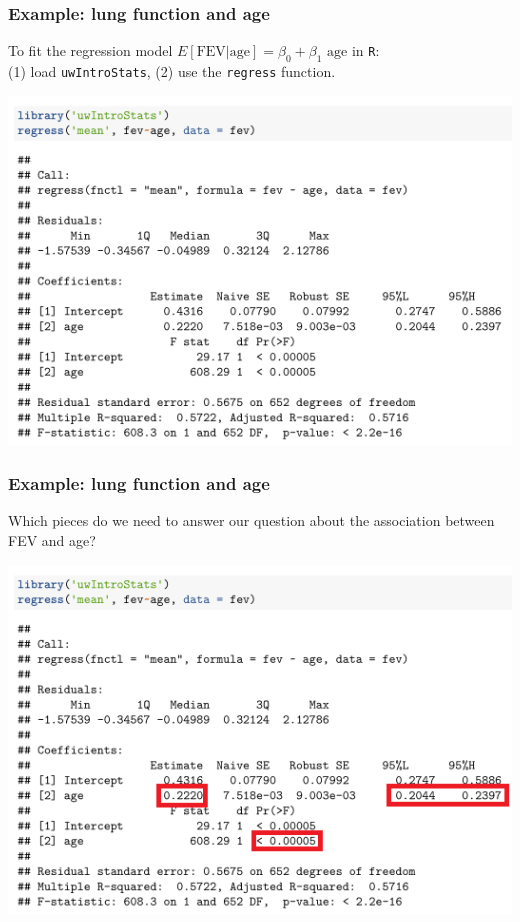 \documentclass[12pt, 
hyperref={colorlinks=true, linkcolor=blue, urlcolor=cyan}]{beamer}
\begin{document}
\begin{frame}
\frametitle{Example: lung function and age}
To fit the regression model \color{blue} $E[\text{FEV}|\text{age}] = \beta_0 + \beta_1 \text{ age}$ \color{black} in \texttt{R}:\\ (1) load \texttt{uwIntroStats}, (2) use the \texttt{regress} function. \vspace{-0.3cm}

\center
\includegraphics[width=0.55\paperwidth]{./plots/regress_fev_vs_age}
\end{frame}

\begin{frame}
\frametitle{Example: lung function and age}
Which pieces do we need to answer our question about the association between FEV and age? \vspace{-0.3cm}

\center
\includegraphics[width=0.55\paperwidth]{./plots/regress_fev_vs_age_highlights}
\end{frame}
\end{document}
